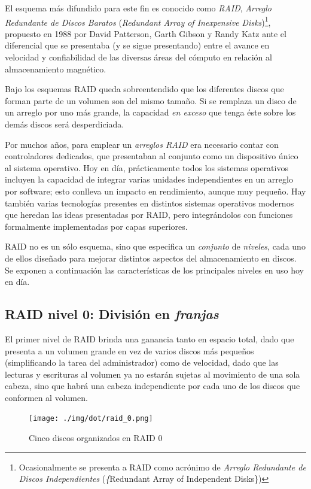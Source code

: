 \documentclass[11pt,fleqn]{book} %
\begin{document}
El esquema más difundido para este fin es conocido como \emph{RAID},
\emph{Arreglo Redundante de Discos Baratos} (\emph{Redundant Array of Inexpensive Disks})\footnote{Ocasionalmente se presenta a RAID como
acrónimo de \emph{Arreglo Redundante de Discos Independientes} (\emph\{Redundant
Array of Independent Disks\}) }, propuesto en 1988 por David Patterson,
Garth Gibson y Randy Katz ante el diferencial que se presentaba (y se
sigue presentando) entre el avance en velocidad y confiabilidad de las
diversas áreas del cómputo en relación al almacenamiento magnético.

Bajo los esquemas RAID queda sobreentendido que los diferentes discos
que forman parte de un volumen son del mismo tamaño. Si se remplaza un
disco de un arreglo por uno más grande, la capacidad \emph{en exceso} que
tenga éste sobre los demás discos será desperdiciada.

Por muchos años, para emplear un \emph{arreglos RAID} era necesario contar
con controladores dedicados, que presentaban al conjunto como un
dispositivo único al sistema operativo. Hoy en día, prácticamente
todos los sistemas operativos incluyen la capacidad de integrar varias
unidades independientes en un arreglo por software; esto conlleva un
impacto en rendimiento, aunque muy pequeño. Hay también varias
tecnologías presentes en distintos sistemas operativos modernos que
heredan las ideas presentadas por RAID, pero integrándolos con
funciones formalmente implementadas por capas superiores.

RAID no es un sólo esquema, sino que especifica un \emph{conjunto} de
\emph{niveles}, cada uno de ellos diseñado para mejorar distintos aspectos
del almacenamiento en discos. Se exponen a continuación las
características de los principales niveles en uso hoy en día.
\subsection{RAID nivel 0: División en \emph{franjas}}
\label{sec-10-2-1}


El primer nivel de RAID brinda una ganancia tanto en espacio total,
dado que presenta a un volumen grande en vez de varios discos más
pequeños (simplificando la tarea del administrador) como de velocidad,
dado que las lecturas y escrituras al volumen ya no estarán sujetas al
movimiento de una sola cabeza, sino que habrá una cabeza independiente
por cada uno de los discos que conformen al volumen.

\begin{figure}[htb]
\centering
\texttt{[image: ./img/dot/raid\_0.png]}
\caption{\label{FS_FIS_raid_0}Cinco discos organizados en RAID 0}
\end{figure}
\end{document}
